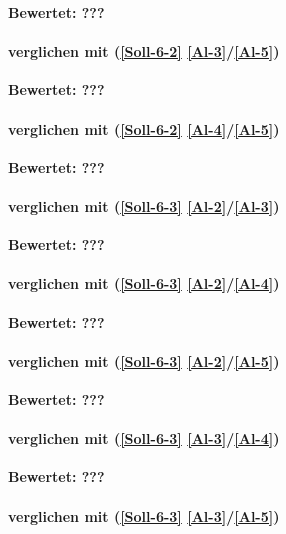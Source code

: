 \textbf{Bewertet: ???}

\paragraph*{  verglichen mit  (\ref{Soll-6-2} \ref{Al-3}/\ref{Al-5})}

\textbf{Bewertet: ???}


\paragraph*{  verglichen mit  (\ref{Soll-6-2} \ref{Al-4}/\ref{Al-5})}

\textbf{Bewertet: ???}


\paragraph*{  verglichen mit  (\ref{Soll-6-3} \ref{Al-2}/\ref{Al-3})}

\textbf{Bewertet: ???}

\paragraph*{  verglichen mit  (\ref{Soll-6-3} \ref{Al-2}/\ref{Al-4})}

\textbf{Bewertet: ???}

\paragraph*{  verglichen mit  (\ref{Soll-6-3} \ref{Al-2}/\ref{Al-5})}

\textbf{Bewertet: ???}

\paragraph*{  verglichen mit  (\ref{Soll-6-3} \ref{Al-3}/\ref{Al-4})}

\textbf{Bewertet: ???}

\paragraph*{  verglichen mit  (\ref{Soll-6-3} \ref{Al-3}/\ref{Al-5})}

